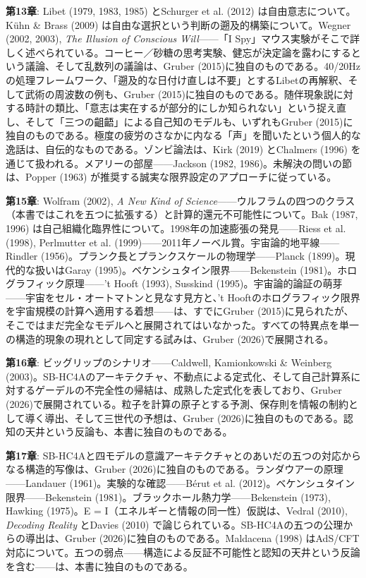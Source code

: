 \documentclass[11pt, twoside, openright]{book}
\begin{document}
\textbf{第13章}: Libet (1979, 1983, 1985) とSchurger et al. (2012) は自由意志について。Kühn \& Brass (2009) は自由な選択という判断の遡及的構築について。Wegner (2002, 2003), \textit{The Illusion of Conscious Will}------「I Spy」マウス実験がそこで詳しく述べられている。コーヒー／砂糖の思考実験、健忘が決定論を露わにするという議論、そして乱数列の議論は、Gruber (2015)に独自のものである。40/20Hzの処理フレームワーク、「遡及的な日付け直しは不要」とするLibetの再解釈、そして武術の周波数の例も、Gruber (2015)に独自のものである。随伴現象説に対する時計の類比、「意志は実在するが部分的にしか知られない」という捉え直し、そして「三つの齟齬」による自己知のモデルも、いずれもGruber (2015)に独自のものである。極度の疲労のさなかに内なる「声」を聞いたという個人的な逸話は、自伝的なものである。ゾンビ論法は、Kirk (2019) とChalmers (1996) を通じて扱われる。メアリーの部屋------Jackson (1982, 1986)。未解決の問いの節は、Popper (1963) が推奨する誠実な限界設定のアプローチに従っている。

\textbf{第15章}: Wolfram (2002), \textit{A New Kind of Science}------ウルフラムの四つのクラス（本書ではこれを五つに拡張する）と計算的還元不可能性について。Bak (1987, 1996) は自己組織化臨界性について。1998年の加速膨張の発見------Riess et al. (1998), Perlmutter et al. (1999)------2011年ノーベル賞。宇宙論的地平線------Rindler (1956)。プランク長とプランクスケールの物理学------Planck (1899)。現代的な扱いはGaray (1995)。ベケンシュタイン限界------Bekenstein (1981)。ホログラフィック原理------'t Hooft (1993), Susskind (1995)。宇宙論的論証の萌芽------宇宙をセル・オートマトンと見なす見方と、't Hooftのホログラフィック限界を宇宙規模の計算へ適用する着想------は、すでにGruber (2015)に見られたが、そこではまだ完全なモデルへと展開されてはいなかった。すべての特異点を単一の構造的現象の現れとして同定する試みは、Gruber (2026)で展開される。

\textbf{第16章}: ビッグリップのシナリオ------Caldwell, Kamionkowski \& Weinberg (2003)。SB-HC4Aのアーキテクチャ、不動点による定式化、そして自己計算系に対するゲーデルの不完全性の帰結は、成熟した定式化を表しており、Gruber (2026)で展開されている。粒子を計算の原子とする予測、保存則を情報の制約として導く導出、そして三世代の予想は、Gruber (2026)に独自のものである。認知の天井という反論も、本書に独自のものである。

\textbf{第17章}: SB-HC4Aと四モデルの意識アーキテクチャとのあいだの五つの対応からなる構造的写像は、Gruber (2026)に独自のものである。ランダウアーの原理------Landauer (1961)。実験的な確認------Bérut et al. (2012)。ベケンシュタイン限界------Bekenstein (1981)。ブラックホール熱力学------Bekenstein (1973), Hawking (1975)。E = I（エネルギーと情報の同一性）仮説は、Vedral (2010), \textit{Decoding Reality} とDavies (2010) で論じられている。SB-HC4Aの五つの公理からの導出は、Gruber (2026)に独自のものである。Maldacena (1998) はAdS/CFT対応について。五つの弱点------構造による反証不可能性と認知の天井という反論を含む------は、本書に独自のものである。
\end{document}
